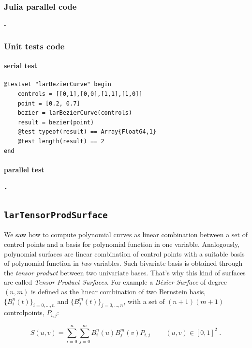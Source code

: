 \documentclass[a4paper,11pt]{article}
\begin{document}
\subsubsection{Julia parallel code}

-

\subsubsection{Unit tests code}

\paragraph{serial test}
\begin{verbatim}
@testset "larBezierCurve" begin
    controls = [[0,1],[0,0],[1,1],[1,0]]
    point = [0.2, 0.7]
    bezier = larBezierCurve(controls)
    result = bezier(point)
    @test typeof(result) == Array{Float64,1}
    @test length(result) == 2
end
\end{verbatim}

\paragraph{parallel test}
\begin{verbatim}
-
\end{verbatim}


\subsection{\texttt{larTensorProdSurface}}

We saw how to compute polynomial curves as linear combination between a set of control points and a basis for polynomial function in one variable. Analogously, polynomial surfaces are linear combination of control points with a suitable basis of polynomial function in \emph{two} variables. Such bivariate basis is obtained through the \emph{tensor product} between two univariate bases. That's why this kind of surfaces are called \emph{Tensor Product Surfaces}. For example a \emph{B\'ezier Surface} of degree $(n,m)$ is defined as the linear combination of two Bernstein basis, $\{B_i^n(t)\}_{i=0,...,n}$ and $\{B_j^m(t)\}_{j=0,...,n}$, with a set of $(n+1)(m+1)$ controlpoints, $P_{i,j}$:

\begin{equation*}
\label{eqn: tensorprod}
S(u,v) =\sum_{i=0}^n\sum_{j=0}^m B_i^n(u) B_j^m(v) P_{i,j}\;\;\;\;\;\;\;\; (u,v)\in [0,1]^2 \;.
\end{equation*}
\end{document}
